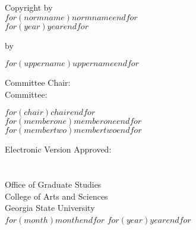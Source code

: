   \newpage
  
  \vspace*{0.7\textheight}
  \begin{center}
    \parbox[]{\textwidth}{
      \begin{center}
        Copyright by \\
        $for(normname)$$normname$$endfor$ \\
        $for(year)$$year$$endfor$
      \end{center}}
  \end{center}
  
  \newpage
  
  
  
  
  
  
  \begin{center}
    \parbox[]{\textwidth}{\centering \titlediss}
    \end{center}
  
    \vspace*{0.5in}
    \centerline{by}
    \vspace*{0.5in}
    \centerline{$for(uppername)$$uppername$$endfor$}
    \vspace*{1in}
  
    \hspace{0.33\textwidth}
    \begin{minipage}[t]{0.33\textwidth}
    Committee Chair:\\
    Committee: \\
    \end{minipage}%
    \begin{minipage}[t]{0.33\textwidth}
    \begin{flushright}
    $for(chair)$$chair$$endfor$ \\
    $for(memberone)$$memberone$$endfor$ \\
    $for(membertwo)$$membertwo$$endfor$ \\
    \end{flushright}
    \end{minipage}%
    \vspace{1cm}
  
    \parbox[b]{\textwidth}{
    Electronic Version Approved:\\\\\\
    Office of Graduate Studies\\
    College of Arts and Sciences\\
    Georgia State University\\
    $for(month)$$month$$endfor$ $for(year)$$year$$endfor$
    }


  \let\mainmatter\relax